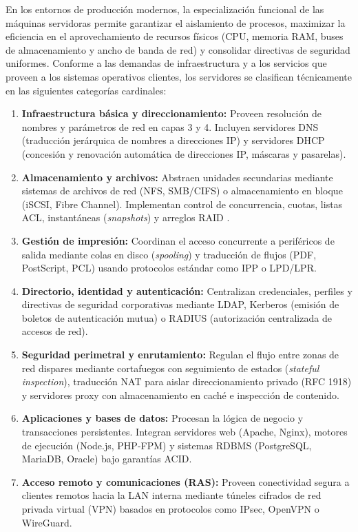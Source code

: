 \documentclass[12pt]{article}
\begin{document}
En los entornos de producción modernos, la especialización funcional de las máquinas servidoras permite garantizar el aislamiento de procesos, maximizar la eficiencia en el aprovechamiento de recursos físicos (CPU, memoria RAM, buses de almacenamiento y ancho de banda de red) y consolidar directivas de seguridad uniformes. Conforme a las demandas de infraestructura y a los servicios que proveen a los sistemas operativos clientes, los servidores se clasifican técnicamente en las siguientes categorías cardinales:

\begin{enumerate}[noitemsep, topsep=1pt, parsep=0pt]
    \item \textbf{Infraestructura básica y direccionamiento:} Proveen resolución de nombres y parámetros de red en capas 3 y 4. Incluyen servidores DNS (traducción jerárquica de nombres a direcciones IP) y servidores DHCP (concesión y renovación automática de direcciones IP, máscaras y pasarelas).
    \item \textbf{Almacenamiento y archivos:} Abstraen unidades secundarias mediante sistemas de archivos de red (NFS, SMB/CIFS) o almacenamiento en bloque (iSCSI, Fibre Channel). Implementan control de concurrencia, cuotas, listas ACL, instantáneas (\textit{snapshots}) y arreglos RAID \parencite[\S 10, pp.\ 325--326]{mchoes2011sistemas}.
    \item \textbf{Gestión de impresión:} Coordinan el acceso concurrente a periféricos de salida mediante colas en disco (\textit{spooling}) y traducción de flujos (PDF, PostScript, PCL) usando protocolos estándar como IPP o LPD/LPR.
    \item \textbf{Directorio, identidad y autenticación:} Centralizan credenciales, perfiles y directivas de seguridad corporativas mediante LDAP, Kerberos (emisión de boletos de autenticación mutua) o RADIUS (autorización centralizada de accesos de red).
    \item \textbf{Seguridad perimetral y enrutamiento:} Regulan el flujo entre zonas de red dispares mediante cortafuegos con seguimiento de estados (\textit{stateful inspection}), traducción NAT para aislar direccionamiento privado (RFC 1918) y servidores proxy con almacenamiento en caché e inspección de contenido.
    \item \textbf{Aplicaciones y bases de datos:} Procesan la lógica de negocio y transacciones persistentes. Integran servidores web (Apache, Nginx), motores de ejecución (Node.js, PHP-FPM) y sistemas RDBMS (PostgreSQL, MariaDB, Oracle) bajo garantías ACID.
    \item \textbf{Acceso remoto y comunicaciones (RAS):} Proveen conectividad segura a clientes remotos hacia la LAN interna mediante túneles cifrados de red privada virtual (VPN) basados en protocolos como IPsec, OpenVPN o WireGuard.
\end{enumerate}
\end{document}
